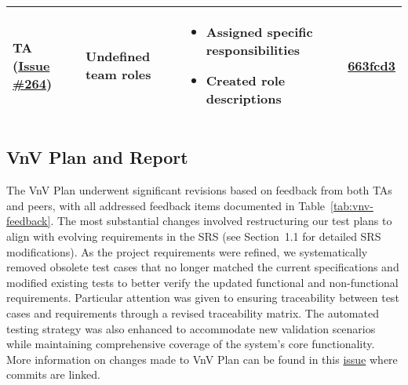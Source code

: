 \documentclass{article}
\begin{document}
\begin{longtable}{|p{2cm}|p{3.5cm}|p{4.5cm}|p{3cm}|}
    TA (\href{https://github.com/ssm-lab/capstone--source-code-optimizer/issues/264}{Issue \#264}) & 
    Undefined team roles &
    \begin{itemize}[nosep,leftmargin=*]
        \item Assigned specific responsibilities
        \item Created role descriptions
    \end{itemize} &
    \href{https://github.com/ssm-lab/capstone--source-code-optimizer/commit/663fcd3}{663fcd3} \\
    \hline
    
\end{longtable}

\subsection{VnV Plan and Report}

The VnV Plan underwent significant revisions based on feedback from both TAs and peers, with all addressed feedback items documented in Table~\ref{tab:vnv-feedback}. The most substantial changes involved restructuring our test plans to align with evolving requirements in the SRS (see Section~1.1 for detailed SRS modifications). As the project requirements were refined, we systematically removed obsolete test cases that no longer matched the current specifications and modified existing tests to better verify the updated functional and non-functional requirements. Particular attention was given to ensuring traceability between test cases and requirements through a revised traceability matrix. The automated testing strategy was also enhanced to accommodate new validation scenarios while maintaining comprehensive coverage of the system's core functionality.\\

\noindent More information on changes made to VnV Plan can be found in this \href{https://github.com/ssm-lab/capstone--source-code-optimizer/issues/528}{issue} where commits are linked.
\end{document}
